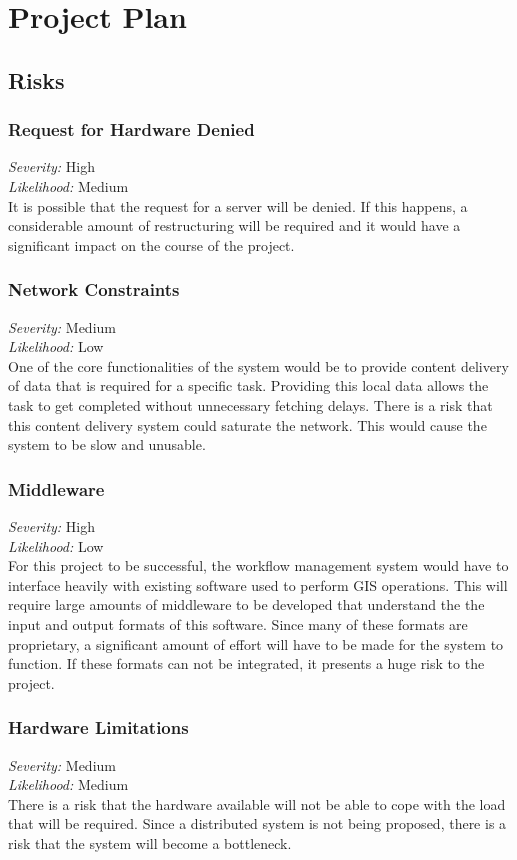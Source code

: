 \documentclass[12pt,a4paper]{article}
\begin{document}
\section{Project Plan}
\subsection{Risks}
\subsubsection*{Request for Hardware Denied}
\noindent \textit{Severity: } High \\
\noindent \textit{Likelihood: } Medium \\
It is possible that the request for a server will be denied. If this happens,
a considerable amount of restructuring will be required and it would have a
significant impact on the course of the project.
\subsubsection*{Network Constraints}
\noindent \textit{Severity: } Medium \\
\noindent \textit{Likelihood: } Low \\
One of the core functionalities of the system would be to provide
content delivery of data that is required for a specific task. Providing
this local data allows the task to get completed without unnecessary
fetching delays. There is a risk that this content delivery system
could saturate the network. This would cause the system to be slow
and unusable.
\subsubsection*{Middleware}
\noindent \textit{Severity: } High \\
\noindent \textit{Likelihood: } Low \\
For this project to be successful, the workflow management system would have to interface
heavily with existing software used to perform GIS operations. This will
require large amounts of middleware to be developed that understand the
the input and output formats of this software. Since many of these
formats are proprietary, a significant amount of effort will have to
be made for the system to function. If these formats can not be integrated,
it presents a huge risk to the project.
\subsubsection*{Hardware Limitations}
\noindent \textit{Severity: } Medium \\
\noindent \textit{Likelihood: } Medium \\
There is a risk that the hardware available will not be able to cope
with the load that will be required. Since a distributed system is
not being proposed, there is a risk that the system will become a bottleneck.
\end{document}
